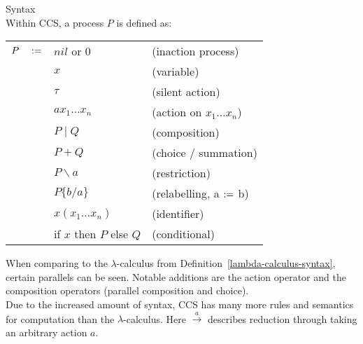     \begin{definition}{Syntax\\}
        Within CCS, a process $P$ is defined as:
        \begin{center}
            \begin{tabular}{ l l l }
                $P \quad :=$    & $nil$ or $0$              & (inaction process) \\
                                    & $x$                       & (variable) \\
                                    & $\tau$                    & (silent action) \\
                                    & $a x_1 \ldots x_n$        & (action on $x_1 \ldots x_n$)~\footnotemark\\
                                    & $P \; | \; Q$             & (composition) \\
                                    & $P + Q$                   & (choice / summation)\\
                                    & $P \backslash a$          & (restriction) \\
                                    & $P\{b / a\}$                & (relabelling, a $:=$ b)~\footnotemark\\
                                    & $x(x_1 \ldots x_n)$       & (identifier) \\
                                    & if $x$ then $P$ else $Q$  & (conditional)
            \end{tabular}
        \end{center}
        \addtocounter{footnote}{-2}
    \end{definition}
    When comparing to the $\lambda$-calculus from Definition~\ref{lambda-calculus-syntax}, certain parallels can be seen.
    Notable additions are the action operator and the composition operators (parallel composition and choice). \\


    Due to the increased amount of syntax, CCS has many more rules and semantics for computation than the $\lambda$-calculus.
    Here $\xrightarrow{a}$ describes reduction through taking an arbitrary action $a$.

